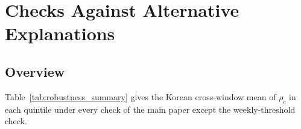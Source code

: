\documentclass[a4paper,fleqn]{cas-sc}
\begin{document}
\section{Checks Against Alternative Explanations}\label{sec:robustness}

\subsection{Overview}

Table~\ref{tab:robustness_summary} gives the Korean cross-window mean of $\rho_c$ in each quintile under every check of the main paper except the weekly-threshold check.
\end{document}
